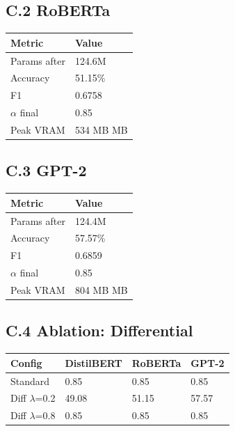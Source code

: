 \subsection{C.2 RoBERTa}

\begin{table}[H]
\centering
\small
\begin{tabular}{ll}
\toprule
\textbf{Metric} & \textbf{Value} \\
\midrule
Params after & 124.6M \\
Accuracy & 51.15\% \\
F1 & 0.6758 \\
$\alpha$ final & 0.85 \\
Peak VRAM & 534 MB MB \\
\bottomrule
\end{tabular}
\end{table}

\subsection{C.3 GPT-2}

\begin{table}[H]
\centering
\small
\begin{tabular}{ll}
\toprule
\textbf{Metric} & \textbf{Value} \\
\midrule
Params after & 124.4M \\
Accuracy & 57.57\% \\
F1 & 0.6859 \\
$\alpha$ final & 0.85 \\
Peak VRAM & 804 MB MB \\
\bottomrule
\end{tabular}
\end{table}

\subsection{C.4 Ablation: Differential}

\begin{table}[H]
\centering
\small
\begin{tabular}{llll}
\toprule
\textbf{Config} & \textbf{DistilBERT} & \textbf{RoBERTa} & \textbf{GPT-2} \\
\midrule
Standard & 0.85 & 0.85 & 0.85 \\
Diff $\lambda$=0.2 & 49.08 & 51.15 & 57.57 \\
Diff $\lambda$=0.8 & 0.85 & 0.85 & 0.85 \\
\bottomrule
\end{tabular}
\end{table}


